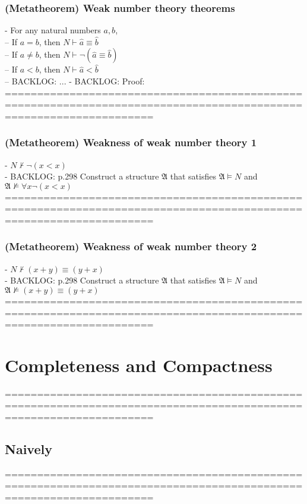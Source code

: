 \documentclass{book}
\newcommand{\inot}{\not}
\begin{document}
\subsection{(Metatheorem) Weak number theory theorems} %
	- For any natural numbers $a, b$, \\
		-- If $a = b$, then $N \vdash \hat{a} \equiv \hat {b}$ \\
		-- If $a \inot = b$, then $N \vdash \lnot (\hat{a} \equiv \hat {b})$ \\
		-- If $a < b$, then $N \vdash \hat{a} < \hat{b}$ \\
		-- BACKLOG: ...
	- BACKLOG: Proof: \\
	===================================================================================================================
\subsection{(Metatheorem) Weakness of weak number theory 1} %
	- $N \inot \vdash \lnot (x < x)$ \\
	- BACKLOG: p.298 Construct a structure $\mathfrak{A}$ that satisfies $\mathfrak{A} \vDash N$ and $\mathfrak{A} \inot \vDash \forall x \lnot (x < x)$ \\
	===================================================================================================================
\subsection{(Metatheorem) Weakness of weak number theory 2} %
	- $N \inot \vdash (x + y) \equiv (y + x)$ \\
	- BACKLOG: p.298 Construct a structure $\mathfrak{A}$ that satisfies $\mathfrak{A} \vDash N$ and $\mathfrak{A} \inot \vDash (x + y) \equiv (y + x)$ \\
	===================================================================================================================


\chapter{Completeness and Compactness}
	===================================================================================================================
\section{Naively}
	===================================================================================================================
\end{document}
